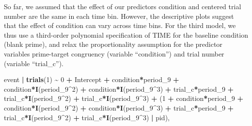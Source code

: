 \documentclass[
  man,floatsintext]{apa6}
\newenvironment{Shaded}{\begin{snugshade}}{\end{snugshade}}
\newcommand{\DecValTok}[1]{\textcolor[rgb]{0.00,0.00,0.81}{#1}}
\newcommand{\FunctionTok}[1]{\textcolor[rgb]{0.13,0.29,0.53}{\textbf{#1}}}
\newcommand{\NormalTok}[1]{#1}
\newcommand{\SpecialCharTok}[1]{\textcolor[rgb]{0.81,0.36,0.00}{\textbf{#1}}}
\begin{document}
So far, we assumed that the effect of our predictors condition and centered trial number are the same in each time bin. However, the descriptive plots suggest that the effect of condition can vary across time bins.
For the third model, we thus use a third-order polynomial specification of TIME for the baseline condition (blank prime), and relax the proportionality assumption for the predictor variables prime-target congruency (variable ``condition'') and trial number (variable ``trial\_c'').

\scriptsize

\begin{Shaded}
\begin{Highlighting}[]
\NormalTok{        event }\SpecialCharTok{|} \FunctionTok{trials}\NormalTok{(}\DecValTok{1}\NormalTok{) }\SpecialCharTok{\textasciitilde{}} \DecValTok{0} \SpecialCharTok{+}\NormalTok{ Intercept }\SpecialCharTok{+} 
\NormalTok{                            condition}\SpecialCharTok{*}\NormalTok{period\_9 }\SpecialCharTok{+}  
\NormalTok{                            condition}\SpecialCharTok{*}\FunctionTok{I}\NormalTok{(period\_9}\SpecialCharTok{\^{}}\DecValTok{2}\NormalTok{) }\SpecialCharTok{+}  
\NormalTok{                            condition}\SpecialCharTok{*}\FunctionTok{I}\NormalTok{(period\_9}\SpecialCharTok{\^{}}\DecValTok{3}\NormalTok{) }\SpecialCharTok{+} 
\NormalTok{                            trial\_c}\SpecialCharTok{*}\NormalTok{period\_9 }\SpecialCharTok{+}  
\NormalTok{                            trial\_c}\SpecialCharTok{*}\FunctionTok{I}\NormalTok{(period\_9}\SpecialCharTok{\^{}}\DecValTok{2}\NormalTok{) }\SpecialCharTok{+}  
\NormalTok{                            trial\_c}\SpecialCharTok{*}\FunctionTok{I}\NormalTok{(period\_9}\SpecialCharTok{\^{}}\DecValTok{3}\NormalTok{) }\SpecialCharTok{+} 
\NormalTok{                            (}\DecValTok{1} \SpecialCharTok{+}\NormalTok{ condition}\SpecialCharTok{*}\NormalTok{period\_9 }\SpecialCharTok{+} 
\NormalTok{                            condition}\SpecialCharTok{*}\FunctionTok{I}\NormalTok{(period\_9}\SpecialCharTok{\^{}}\DecValTok{2}\NormalTok{) }\SpecialCharTok{+} 
\NormalTok{                            condition}\SpecialCharTok{*}\FunctionTok{I}\NormalTok{(period\_9}\SpecialCharTok{\^{}}\DecValTok{3}\NormalTok{) }\SpecialCharTok{+} 
\NormalTok{                            trial\_c}\SpecialCharTok{*}\NormalTok{period\_9 }\SpecialCharTok{+}  
\NormalTok{                            trial\_c}\SpecialCharTok{*}\FunctionTok{I}\NormalTok{(period\_9}\SpecialCharTok{\^{}}\DecValTok{2}\NormalTok{) }\SpecialCharTok{+}  
\NormalTok{                            trial\_c}\SpecialCharTok{*}\FunctionTok{I}\NormalTok{(period\_9}\SpecialCharTok{\^{}}\DecValTok{3}\NormalTok{) }\SpecialCharTok{|}\NormalTok{ pid), }
\end{Highlighting}
\end{Shaded}
\end{document}
